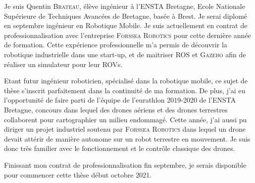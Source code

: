 \documentclass[11pt, a4paper]{awesome-cv}
\begin{document}
	\makecvheader[C]


	\makelettertitle

	\begin{cvletter}

		Je suis Quentin \textsc{Brateau}, élève ingénieur à l'\textsc{ENSTA} Bretagne, Ecole Nationale Supérieure de Techniques Avancées de Bretagne, basée à Brest. Je serai diplomé en septembre ingénieur en Robotique Mobile. Je suis actuellement en contrat de professionnalisation avec l'entreprise \textsc{Forssea Robotics} pour cette dernière année de formation. Cette expérience professionnelle m'a permis de découvrir la robotique industrielle dans une start-up, et de maitriser \textsc{ROS} et \textsc{Gazebo} afin de réaliser un simulateur pour leur \textsc{ROV}s.

		Etant futur ingénieur roboticien, spécialisé dans la robotique mobile, ce sujet de thèse s'inscrit parfaitement dans la continuité de ma formation. De plus, j'ai eu l'opportunité de faire parti de l'équipe de l'eurathlon 2019-2020 de l'\textsc{ENSTA} Bretagne, concours dans lequel des drones aériens et des drones terrestres collaborent pour cartographier un milieu endommagé. Cette année, j'ai aussi pu diriger un projet industriel soutenu par \textsc{Forssea Robotics} dans lequel un drone devait attérir de manière autonome sur un robot terrestre en mouvement. Je suis donc très familier avec le fonctionnement et le contrôle classique des drones.

		Finissant mon contrat de professionnalisation fin septembre, je serais disponible pour commencer cette thèse début octobre 2021.

	\end{cvletter}

	\makeletterclosing
\end{document}
